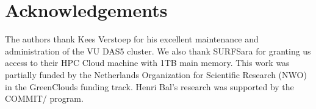 \section{Acknowledgements}

The authors thank Kees Verstoep for his excellent maintenance
and administration of the VU DAS5 cluster. We also thank SURFSara for
granting us access to their HPC Cloud machine with 1TB main memory.
This work was partially funded by the Netherlands Organization for Scientific
Research (NWO) in the GreenClouds funding track. Henri Bal's research
was supported by the COMMIT/ program.

